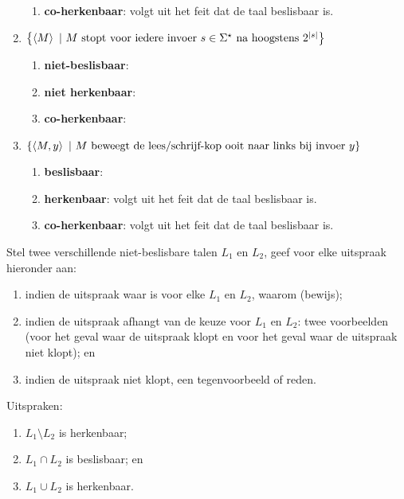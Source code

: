 \documentclass{article}
\begin{document}
\begin{question}[Berekenbaarheid]
\begin{answer}
\begin{enumerate}
\begin{enumerate}
  \item \textbf{co-herkenbaar}: volgt uit het feit dat de taal beslisbaar is.
 \end{enumerate}
 \item $\left\{ \left\langle M \right\rangle\ |\ \mbox{$M$ stopt voor iedere invoer $s\in\Sigma^{\star}$ na hoogstens $2^{\left|s\right|}$} \right\}$
 \begin{enumerate}
  \item \textbf{niet-beslisbaar}: 
  \item \textbf{niet herkenbaar}: 
  \item \textbf{co-herkenbaar}: 
 \end{enumerate}
 \item $\left\{ \left\langle M,y \right\rangle\ |\ \mbox{$M$ beweegt de lees/schrijf-kop ooit naar links bij invoer $y$} \right\}$
 \begin{enumerate}
  \item \textbf{beslisbaar}: 
  \item \textbf{herkenbaar}: volgt uit het feit dat de taal beslisbaar is.
  \item \textbf{co-herkenbaar}: volgt uit het feit dat de taal beslisbaar is.
 \end{enumerate}
\end{enumerate}
\end{answer}
\end{question}

\begin{question}
Stel twee verschillende niet-beslisbare talen $L_1$ en $L_2$, geef voor elke uitspraak hieronder aan:
\begin{enumerate}
 \item indien de uitspraak waar is voor elke $L_1$ en $L_2$, waarom (bewijs);
 \item indien de uitspraak afhangt van de keuze voor $L_1$ en $L_2$: twee voorbeelden (voor het geval waar de uitspraak klopt en voor het geval waar de uitspraak niet klopt); en
 \item indien de uitspraak niet klopt, een tegenvoorbeeld of reden.
\end{enumerate}
Uitspraken:
\begin{enumerate}
 \item $L_1\setminus L_2$ is herkenbaar;
 \item $L_1\cap L_2$ is beslisbaar; en
 \item $L_1\cup L_2$ is herkenbaar.
\end{enumerate}
\end{question}
\end{document}
